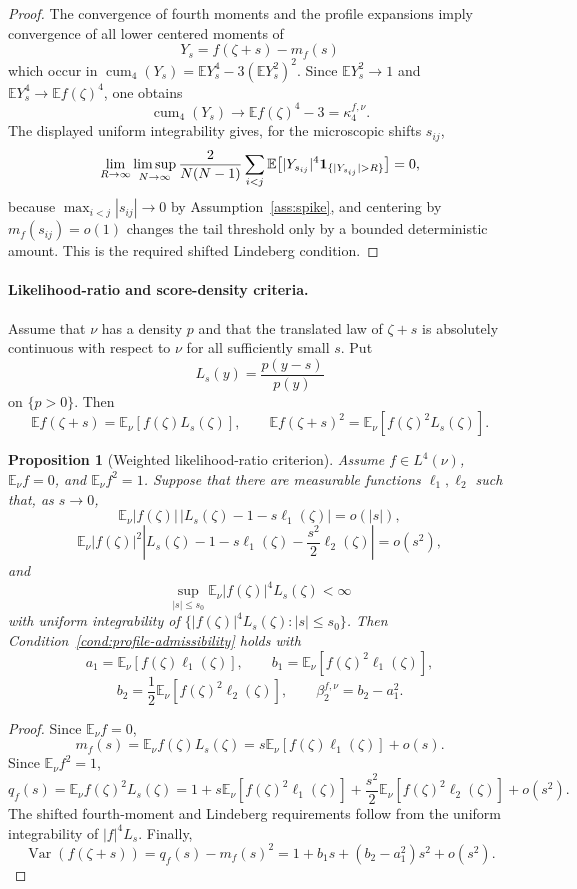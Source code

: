 \documentclass[10pt,a4paper]{amsart}
\newtheorem{proposition}[theorem]{Proposition}
\newcommand{\E}{\mathbb E}
\newcommand{\Var}{\operatorname{Var}}
\newcommand{\cum}{\operatorname{cum}}
\begin{document}
\begin{proof}
The convergence of fourth moments and the profile expansions imply convergence of all lower centered moments of
\[
        Y_s=f(\zeta+s)-m_f(s)
\]
which occur in \(\cum_4(Y_s)=\E Y_s^4-3(\E Y_s^2)^2\).  Since \(\E Y_s^2\to1\) and \(\E Y_s^4\to\E f(\zeta)^4\), one obtains
\[
        \cum_4(Y_s)\to \E f(\zeta)^4-3=\kappa_4^{f,\nu}.
\]
The displayed uniform integrability gives, for the microscopic shifts \(s_{ij}\),
\[
\lim_{R\to\infty}\limsup_{N\to\infty}
\frac{2}{N(N-1)}\sum_{i<j}
\E\bigl[|Y_{s_{ij}}|^4{\bf 1}_{\{|Y_{s_{ij}}|>R\}}\bigr]=0,
\]
because \(\max_{i<j}|s_{ij}|\to0\) by Assumption~\ref{ass:spike}, and centering by \(m_f(s_{ij})=o(1)\) changes the tail threshold only by a bounded deterministic amount.  This is the required shifted Lindeberg condition.
\end{proof}


\paragraph{Likelihood-ratio and score-density criteria.}

Assume that \(\nu\) has a density \(p\) and that the translated law of \(\zeta+s\) is absolutely continuous with respect to \(\nu\) for all sufficiently small \(s\).  Put
\[
        L_s(y)=\frac{p(y-s)}{p(y)}
\]
on \(\{p>0\}\).  Then
\[
        \E f(\zeta+s)=\E_\nu[f(\zeta)L_s(\zeta)],\qquad
        \E f(\zeta+s)^2=\E_\nu[f(\zeta)^2L_s(\zeta)].
\]

\begin{proposition}[Weighted likelihood-ratio criterion]
\label{prop:likelihood-W}
Assume \(f\in L^4(\nu)\), \(\E_\nu f=0\), and
\(\E_\nu f^2=1\).  Suppose that there are measurable functions
\(\ell_1,\ell_2\) such that, as \(s\to0\),
\[
        \E_\nu |f(\zeta)|\,|L_s(\zeta)-1-s\ell_1(\zeta)|=o(|s|),
\]
\[
        \E_\nu |f(\zeta)|^2\left|L_s(\zeta)-1-s\ell_1(\zeta)-\frac{s^2}{2}\ell_2(\zeta)\right|=o(s^2),
\]
and
\[
        \sup_{|s|\le s_0}\E_\nu |f(\zeta)|^4L_s(\zeta)<\infty
\]
with uniform integrability of \(\{|f(\zeta)|^4L_s(\zeta): |s|\le s_0\}\).  Then Condition~\ref{cond:profile-admissibility} holds with
\[
        a_1=\E_\nu[f(\zeta)\ell_1(\zeta)],\qquad
        b_1=\E_\nu[f(\zeta)^2\ell_1(\zeta)],
\]
\[
        b_2=\frac12\E_\nu[f(\zeta)^2\ell_2(\zeta)],\qquad
        \beta_2^{f,\nu}=b_2-a_1^2.
\]
\end{proposition}

\begin{proof}
Since \(\E_\nu f=0\),
\[
        m_f(s)=\E_\nu f(\zeta)L_s(\zeta)=s\E_\nu[f(\zeta)\ell_1(\zeta)]+o(s).
\]
Since \(\E_\nu f^2=1\),
\[
        q_f(s)=\E_\nu f(\zeta)^2L_s(\zeta)
        =1+s\E_\nu[f(\zeta)^2\ell_1(\zeta)]+\frac{s^2}{2}\E_\nu[f(\zeta)^2\ell_2(\zeta)]+o(s^2).
\]
The shifted fourth-moment and Lindeberg requirements follow from the uniform integrability of \(|f|^4L_s\).  Finally,
\[
        \Var(f(\zeta+s))=q_f(s)-m_f(s)^2=1+b_1s+(b_2-a_1^2)s^2+o(s^2).
\]
\end{proof}
\end{document}
